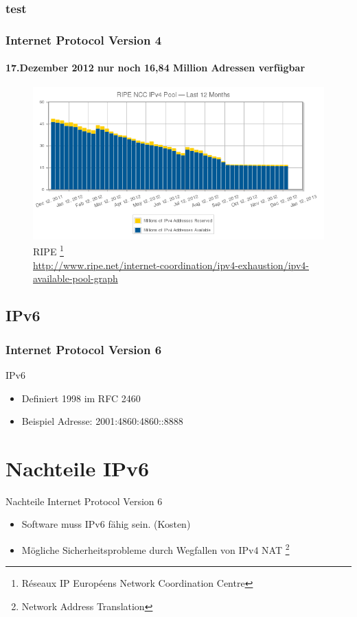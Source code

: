 \documentclass[xcolor=dvipsnames]{beamer}
\begin{document}
\subsubsection{test}
\begin{frame}  
  \frametitle{Internet Protocol Version 4}
  \framesubtitle{17.Dezember 2012 nur noch 16,84 Million Adressen verfügbar}
	\begin{figure}
	\includegraphics[scale=0.4]{IPv4_pool.png}
			\caption{RIPE \footnote{Réseaux IP Européens Network Coordination Centre} \\ \tiny{\textcolor{gray}{\url{http://www.ripe.net/internet-coordination/ipv4-exhaustion/ipv4-available-pool-graph}}}}
	\end{figure}
\end{frame}

\subsection{IPv6}
\begin{frame}
  \frametitle{Internet Protocol Version 6}
  \begin{block}{IPv6}
	  \begin{itemize}
  		\item Definiert 1998 im RFC 2460 
  		\item Beispiel Adresse: 2001:4860:4860::8888
	  \end{itemize}
  \end{block}
\end{frame}



\section{Nachteile IPv6}
\begin{frame}
  \begin{alertblock}{Nachteile Internet Protocol Version 6}
	  \begin{itemize}
	    \item Software muss IPv6 fähig sein. (Kosten)
	    \item Mögliche Sicherheitsprobleme durch Wegfallen von IPv4 NAT \footnote{Network Address Translation}
	  \end{itemize}
  \end{alertblock}
\end{frame}
\end{document}
